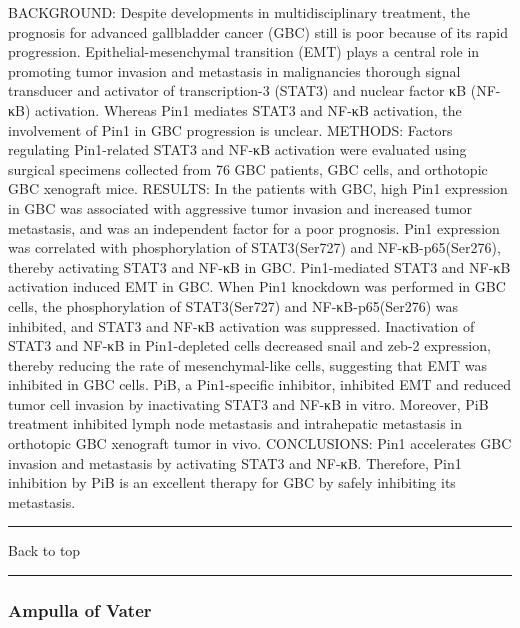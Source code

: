 \documentclass[]{article}
\begin{document}
BACKGROUND: Despite developments in multidisciplinary treatment, the
prognosis for advanced gallbladder cancer (GBC) still is poor because of
its rapid progression. Epithelial-mesenchymal transition (EMT) plays a
central role in promoting tumor invasion and metastasis in malignancies
thorough signal transducer and activator of transcription-3 (STAT3) and
nuclear factor κB (NF-κB) activation. Whereas Pin1 mediates STAT3 and
NF-κB activation, the involvement of Pin1 in GBC progression is unclear.
METHODS: Factors regulating Pin1-related STAT3 and NF-κB activation were
evaluated using surgical specimens collected from 76 GBC patients, GBC
cells, and orthotopic GBC xenograft mice. RESULTS: In the patients with
GBC, high Pin1 expression in GBC was associated with aggressive tumor
invasion and increased tumor metastasis, and was an independent factor
for a poor prognosis. Pin1 expression was correlated with
phosphorylation of STAT3(Ser727) and NF-κB-p65(Ser276), thereby
activating STAT3 and NF-κB in GBC. Pin1-mediated STAT3 and NF-κB
activation induced EMT in GBC. When Pin1 knockdown was performed in GBC
cells, the phosphorylation of STAT3(Ser727) and NF-κB-p65(Ser276) was
inhibited, and STAT3 and NF-κB activation was suppressed. Inactivation
of STAT3 and NF-κB in Pin1-depleted cells decreased snail and zeb-2
expression, thereby reducing the rate of mesenchymal-like cells,
suggesting that EMT was inhibited in GBC cells. PiB, a Pin1-specific
inhibitor, inhibited EMT and reduced tumor cell invasion by inactivating
STAT3 and NF-κB in vitro. Moreover, PiB treatment inhibited lymph node
metastasis and intrahepatic metastasis in orthotopic GBC xenograft tumor
in vivo. CONCLUSIONS: Pin1 accelerates GBC invasion and metastasis by
activating STAT3 and NF-κB. Therefore, Pin1 inhibition by PiB is an
excellent therapy for GBC by safely inhibiting its metastasis.

{}

{}

\begin{center}\rule{0.5\linewidth}{\linethickness}\end{center}

Back to top

\begin{center}\rule{0.5\linewidth}{\linethickness}\end{center}

\pagebreak

\hypertarget{ampulla-of-vater-1}{%
\subsubsection{Ampulla of Vater}\label{ampulla-of-vater-1}}
\end{document}
